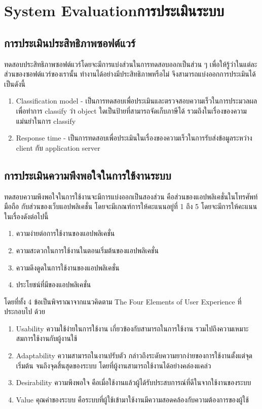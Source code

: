 
\chapter{\ifenglish System Evaluation\else การประเมินระบบ\fi}

\section{การประเมินประสิทธิภาพซอฟต์แวร์}
ทดสอบประสิทธิภาพซอฟต์แวร์โดยจะมีการแบ่งส่วนในการทดสอบออกเป็นส่วน ๆ เพื่อให้รู้ว่าในแต่ละส่วนของซอฟต์แวร์ของเรานั้น 
ทำงานได้อย่างมีประสิทธิภาพหรือไม่ จึงสามารถแบ่งออกการประเมินได้เป็นดังนี้ 
\begin{enumerate}
    \item Classification model - เป็นการทดสอบเพื่อประเมินและตรวจสอบความเร็วในการประมวลผลเพื่อทำการ classify 
    ว่า object ใดเป็นป้ายที่สามารถจัดเก็บภาษีได้ รวมถึงในเรื่องของความแม่นยำในการ classify  
    \item Response time - เป็นการทดสอบเพื่อประเมินในเรื่องของความเร็วในการรับส่งข้อมูลระหว่าง client กับ application server  
\end{enumerate}

\section{การประเมินความพึงพอใจในการใช้งานระบบ}
ทดสอบความพึงพอใจในการใช้งานจะมีการแบ่งออกเป็นสองส่วน คือส่วนของแอปพลิเคชั่นในโทรศัพท์มือถือ กับส่วนของเว็บแอปพลิเคชั่น 
โดยจะมีเกณฑ์การให้คะแนนอยู่ที่ 1 ถึง 5 โดยจะมีการให้คะแนนในเรื่องดังต่อไปนี้ 
\begin{enumerate}
    \item ความง่ายต่อการใช้งานของแอปพลิเคชั่น 
    \item ความสะดวกในการใช้งานในตอนเริ่มต้นของแอปพลิเคชั่น 
    \item ความดึงดูดในการใช้งานของแอปพลิเคชั่น        
    \item ประโยชน์ที่มีของแอปพลิเคชั่น 
\end{enumerate}
โดยที่ทั้ง 4 ข้อเป็นพิจราณาจากแนวคิดตาม The Four Elements of User Experience \cite{uxquantification} ที่ประกอบไป ด้วย 
\begin{enumerate}
    \item Usability ความใช้ง่ายในการใช้งาน เกี่ยวข้องกับสามารถในการใช้งาน รวมไปถึงความเหมาะสมการใช้งานกับผู้งานใช้ 
    \item Adaptability ความสามารถในงานปรับตัว กล่าวถึงระดับความยากง่ายของการใช้งานตั้งแต่จุดเริ่มต้น จนถึงจุดสิ้นสุดของระบบ โดยที่ผู้งานสามารถใช้งานได้อย่างคล่องแคล่ว 
    \item Desirability ความพึงพอใจ คือเมื่อใช้งานแล้วผู้ได้รับประสบการณ์ที่ดีในจากใช้งานของระบบ 
    \item Value คุณค่าของระบบ คือระบบที่ผู้ใช้เข้ามาใช้งานมีความสอดคล้องกับความต้องการของผู้ใช้ 
\end{enumerate}
